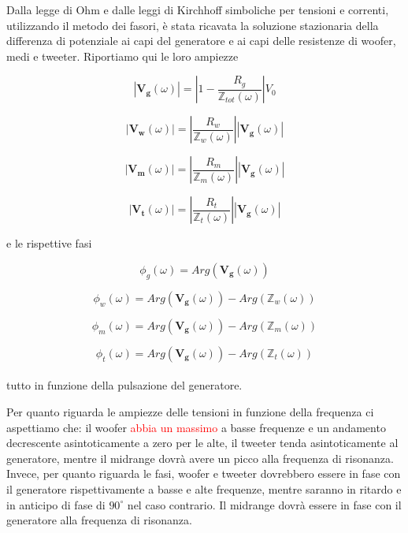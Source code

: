 \documentclass[12pt,italian]{article}
\newcommand{\err}[1]{\textcolor{red}{#1}}
\begin{document}
Dalla legge di Ohm e dalle leggi di Kirchhoff simboliche per tensioni e
correnti, utilizzando il metodo dei fasori, è stata ricavata la soluzione
stazionaria della differenza di potenziale ai capi del generatore e ai capi
delle resistenze di woofer, medi e tweeter. Riportiamo qui le loro ampiezze

\begin{equation}
	\left| \mathbf{V_{g}}(\omega) \right| = \left| 1 - \frac{R_g}
	{\mathbb{Z}_{tot}(\omega)}\right| V_{0}
	\label{eq:Vg}
\end{equation}

\begin{equation}
	\left| \mathbf{V_{w}}(\omega) \right| = \left| \frac{R_{w}}
	{\mathbb{Z}_{w}(\omega)}\right|\left| \mathbf{V_{g}}(\omega) \right|
	\label{eq:Vw}
\end{equation}

\begin{equation}
	\left| \mathbf{V_{m}}(\omega) \right| = \left| \frac{R_{m}}
	{\mathbb{Z}_{m}(\omega)}\right|\left| \mathbf{V_{g}}(\omega) \right|
	\label{eq:Vm}
\end{equation}

\begin{equation}
	\left| \mathbf{V_{t}}(\omega) \right| = \left| \frac{R_{t}}
	{\mathbb{Z}_{t}(\omega)}\right|\left| \mathbf{V_{g}}(\omega) \right|
	\label{eq:Vt}
\end{equation}

\noindent
e le rispettive fasi

\begin{equation}
	\phi_{g}(\omega) = Arg(\mathbf{V_{g}}(\omega))
\end{equation}

\begin{equation}
	\phi_{w}(\omega) = Arg(\mathbf{V_{g}}(\omega)) - Arg(\mathbb{Z}_{w}(\omega))
\end{equation}

\begin{equation}
	\phi_{m}(\omega) = Arg(\mathbf{V_{g}}(\omega)) - Arg(\mathbb{Z}_{m}(\omega))
\end{equation}

\begin{equation}
	\phi_{t}(\omega) =  Arg(\mathbf{V_{g}}(\omega)) - Arg(\mathbb{Z}_{t}(\omega))
\end{equation}
\\
tutto in funzione della pulsazione del generatore.

Per quanto riguarda le ampiezze delle tensioni in funzione della frequenza ci
aspettiamo che: il woofer \err{abbia un massimo} a basse frequenze e un
andamento decrescente asintoticamente a zero per le alte, il tweeter tenda
asintoticamente al generatore, mentre il midrange dovrà avere un picco alla
frequenza di risonanza. Invece, per quanto riguarda le fasi, woofer e tweeter
dovrebbero essere in fase con il generatore rispettivamente a basse e alte
frequenze, mentre saranno in ritardo e in anticipo di fase di $90^\circ$ nel
caso contrario. Il midrange dovrà essere in fase con il generatore alla
frequenza di risonanza.
\end{document}

